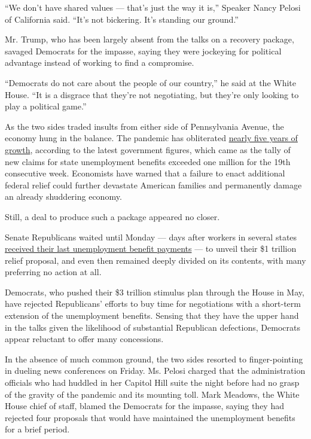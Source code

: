 ``We don't have shared values --- that's just the way it is,'' Speaker
Nancy Pelosi of California said. ``It's not bickering. It's standing our
ground.''

Mr. Trump, who has been largely absent from the talks on a recovery
package, savaged Democrats for the impasse, saying they were jockeying
for political advantage instead of working to find a compromise.

``Democrats do not care about the people of our country,'' he said at
the White House. ``It is a disgrace that they're not negotiating, but
they're only looking to play a political game.''

As the two sides traded insults from either side of Pennsylvania Avenue,
the economy hung in the balance. The pandemic has obliterated
\href{https://www.nytimes.com/2020/07/30/business/economy/q2-gdp-coronavirus-economy.html}{nearly
five years of growth}, according to the latest government figures, which
came as the tally of new claims for state unemployment benefits exceeded
one million for the 19th consecutive week. Economists have warned that a
failure to enact additional federal relief could further devastate
American families and permanently damage an already shuddering economy.

Still, a deal to produce such a package appeared no closer.

Senate Republicans waited until Monday --- days after workers in several
states
\href{https://www.nytimes.com/2020/07/21/business/economy/coronavirus-unemployment-benefits.html}{received
their last unemployment benefit payments} --- to unveil their \$1
trillion relief proposal, and even then remained deeply divided on its
contents, with many preferring no action at all.

Democrats, who pushed their \$3 trillion stimulus plan through the House
in May, have rejected Republicans' efforts to buy time for negotiations
with a short-term extension of the unemployment benefits. Sensing that
they have the upper hand in the talks given the likelihood of
substantial Republican defections, Democrats appear reluctant to offer
many concessions.

In the absence of much common ground, the two sides resorted to
finger-pointing in dueling news conferences on Friday. Ms. Pelosi
charged that the administration officials who had huddled in her Capitol
Hill suite the night before had no grasp of the gravity of the pandemic
and its mounting toll. Mark Meadows, the White House chief of staff,
blamed the Democrats for the impasse, saying they had rejected four
proposals that would have maintained the unemployment benefits for a
brief period.

